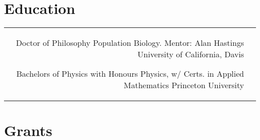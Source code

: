 \documentclass[10pt]{article} %
\begin{document}
\begin{paracol}{2}
\vspace{-\baselineskip}\medskip %



\section{Education} 





\begin{supertabular}{rl} %

	
	{Doctor of Philosophy} %
	{} %
	{Population Biology. Mentor: Alan Hastings} %
	{University of California, Davis} %
	
	
	{Bachelors of Physics} %
	{with Honours} %
	{Physics, w/ Certs. in Applied Mathematics} %
	{Princeton University} %
	

\end{supertabular}


\section{Grants}


\end{paracol}
\end{document}

